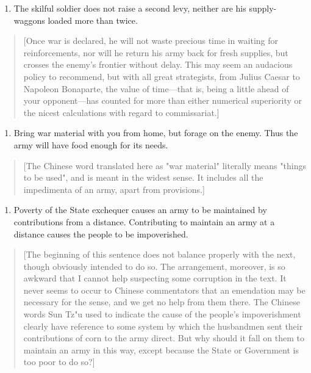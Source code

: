 \documentclass[10pt,a4paper]{book}
\begin{document}
\begin{enumerate}[leftmargin=*, label=\arabic*., resume]
\item The skilful soldier does not raise a second levy, neither are his supply-waggons loaded more than twice.
\end{enumerate}

{\small
\begin{quote}
[Once war is declared, he will not waste precious time in waiting for reinforcements, nor will he return his army back for fresh supplies, but crosses the enemy's frontier without delay. This may seem an audacious policy to recommend, but with all great strategists, from Julius Caesar to Napoleon Bonaparte, the value of time---that is, being a little ahead of your opponent---has counted for more than either numerical superiority or the nicest calculations with regard to commissariat.]
\end{quote}
}

\begin{enumerate}[leftmargin=*, label=\arabic*., wide=0pt, start=9]
\item Bring war material with you from home, but forage on the enemy. Thus the army will have food enough for its needs.
\end{enumerate}

{\small
\begin{quote}
[The Chinese word translated here as "war material" literally means "things to be used", and is meant in the widest sense. It includes all the impedimenta of an army, apart from provisions.]
\end{quote}
}

\begin{enumerate}[leftmargin=*, label=\arabic*., wide=0pt, resume]
\item Poverty of the State exchequer causes an army to be maintained by contributions from a distance. Contributing to maintain an army at a distance causes the people to be impoverished.
\end{enumerate}

{\small
\begin{quote}
[The beginning of this sentence does not balance properly with the next, though obviously intended to do so. The arrangement, moreover, is so awkward that I cannot help suspecting some corruption in the text. It never seems to occur to Chinese commentators that an emendation may be necessary for the sense, and we get no help from them there. The Chinese words Sun Tz"u used to indicate the cause of the people's impoverishment clearly have reference to some system by which the husbandmen sent their contributions of corn to the army direct. But why should it fall on them to maintain an army in this way, except because the State or Government is too poor to do so?]
\end{quote}
}
\end{document}

